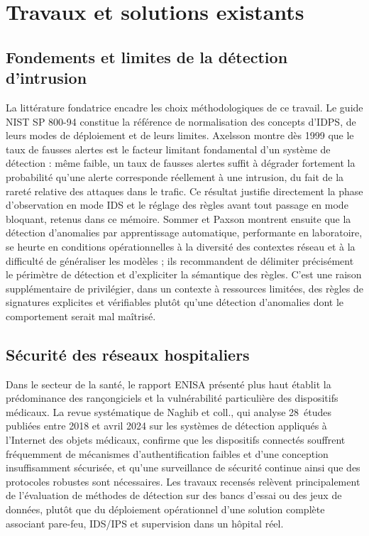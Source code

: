 \section{Travaux et solutions existants}

\subsection{Fondements et limites de la détection d'intrusion}

La littérature fondatrice encadre les choix méthodologiques de ce travail. Le guide NIST SP 800-94 constitue la référence de normalisation des concepts d'IDPS, de leurs modes de déploiement et de leurs limites\cite{nist80094}. Axelsson montre dès 1999 que le taux de fausses alertes est le facteur limitant fondamental d'un système de détection : même faible, un taux de fausses alertes suffit à dégrader fortement la probabilité qu'une alerte corresponde réellement à une intrusion, du fait de la rareté relative des attaques dans le trafic\cite{axelsson1999}. Ce résultat justifie directement la phase d'observation en mode IDS et le réglage des règles avant tout passage en mode bloquant, retenus dans ce mémoire. Sommer et Paxson montrent ensuite que la détection d'anomalies par apprentissage automatique, performante en laboratoire, se heurte en conditions opérationnelles à la diversité des contextes réseau et à la difficulté de généraliser les modèles ; ils recommandent de délimiter précisément le périmètre de détection et d'expliciter la sémantique des règles\cite{sommer2010}. C'est une raison supplémentaire de privilégier, dans un contexte à ressources limitées, des règles de signatures explicites et vérifiables plutôt qu'une détection d'anomalies dont le comportement serait mal maîtrisé.

\subsection{Sécurité des réseaux hospitaliers}

Dans le secteur de la santé, le rapport ENISA présenté plus haut établit la prédominance des rançongiciels et la vulnérabilité particulière des dispositifs médicaux\cite{enisa2023}. La revue systématique de Naghib et coll., qui analyse 28~études publiées entre 2018 et avril 2024 sur les systèmes de détection appliqués à l'Internet des objets médicaux, confirme que les dispositifs connectés souffrent fréquemment de mécanismes d'authentification faibles et d'une conception insuffisamment sécurisée, et qu'une surveillance de sécurité continue ainsi que des protocoles robustes sont nécessaires\cite{naghib2025}. Les travaux recensés relèvent principalement de l'évaluation de méthodes de détection sur des bancs d'essai ou des jeux de données, plutôt que du déploiement opérationnel d'une solution complète associant pare-feu, IDS/IPS et supervision dans un hôpital réel.

